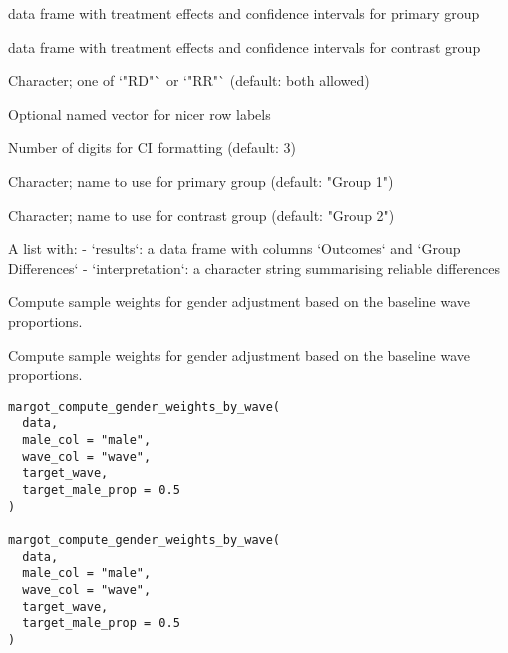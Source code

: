 \documentclass[a4paper]{book}
\begin{document}
\begin{Arguments}
\begin{ldescription}
\item[\code{group}] data frame with treatment effects and confidence intervals for primary group

\item[\code{subgroup}] data frame with treatment effects and confidence intervals for contrast group

\item[\code{type}] Character; one of `"RD"` or `"RR"` (default: both allowed)

\item[\code{label\_mapping}] Optional named vector for nicer row labels

\item[\code{decimal\_places}] Number of digits for CI formatting (default: 3)

\item[\code{group1\_name}] Character; name to use for primary group (default: "Group 1")

\item[\code{group2\_name}] Character; name to use for contrast group (default: "Group 2")
\end{ldescription}
\end{Arguments}
%
\begin{Value}
A list with:
- `results`: a data frame with columns `Outcomes` and `Group Differences`
- `interpretation`: a character string summarising reliable differences
\end{Value}
%
\begin{Description}
Compute sample weights for gender adjustment based on the baseline wave proportions.

Compute sample weights for gender adjustment based on the baseline wave proportions.
\end{Description}
%
\begin{Usage}
\begin{verbatim}
margot_compute_gender_weights_by_wave(
  data,
  male_col = "male",
  wave_col = "wave",
  target_wave,
  target_male_prop = 0.5
)

margot_compute_gender_weights_by_wave(
  data,
  male_col = "male",
  wave_col = "wave",
  target_wave,
  target_male_prop = 0.5
)
\end{verbatim}
\end{Usage}
\end{document}
